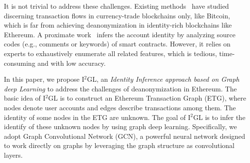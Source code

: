 It is not trivial to address these challenges. Existing methods~\cite{maesa2016analysis,ranshous2017exchange,zhao2015graph} have studied discerning transaction flows in currency-trade blockchains only, like Bitcoin, which is far from achieving deanonymization in identity-rich blockchains like Ethereum. A proximate work~\cite{chen2018infocom} infers the account identity by analyzing source codes (e.g., comments or keywords) of smart contracts. However, it relies on experts to exhaustively enumerate all related features, which is tedious, time-consuming and with low accuracy.


In this paper, we propose I$^2$GL, an \textit{Identity Inference approach based on Graph deep Learning} to address the challenges of deanonymization in Ethereum. The basic idea of I$^2$GL is to construct an Ethereum Transaction Graph (ETG), where nodes denote user accounts and edges describe transactions among them. The identity of some nodes in the ETG are unknown. The goal of I$^2$GL is to infer the identify of these unknown nodes by using graph deep learning. Specifically, we adopt Graph Convolutional Network (GCN), a powerful neural network designed to work directly on graphs by leveraging the graph structure as convolutional layers.

